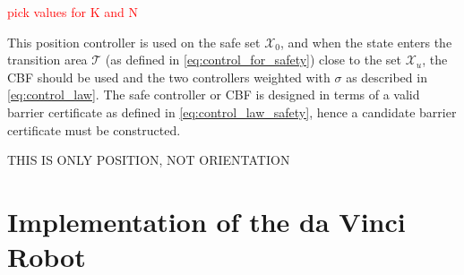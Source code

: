 \textcolor{red}{pick  values for K and N }

This position controller is used on the safe set $\mathcal{X}_0$, and when the state enters the transition area $\mathcal{T}$ (as defined in \autoref{eq:control_for_safety}) close to the set $\mathcal{X}_u$, the CBF should be used and the two controllers weighted with $\sigma$ as described in \autoref{eq:control_law}. The safe controller or CBF is designed in terms of a valid barrier certificate as defined in \autoref{eq:control_law_safety}, hence a candidate barrier certificate must be constructed.




THIS IS ONLY POSITION, NOT ORIENTATION

%
\section{Implementation of the da Vinci Robot}

